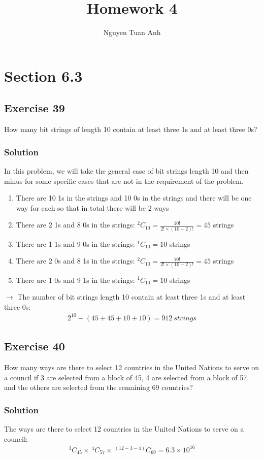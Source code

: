 \documentclass{article}
\title{Homework 4}
\author{Nguyen Tuan Anh}
\theoremstyle{mytheoremstyle}
\theoremstyle{mytheoremstyle}
\theoremstyle{myproblemstyle}
\begin{document}
    \maketitle
    \section*{Section 6.3}
    \subsection*{Exercise 39}
    How many bit strings of length 10 contain at least three
    1s and at least three 0s?
    \subsubsection*{Solution}
    In this problem, we will take the general case of bit strings length 10 and then minus
    for some specific cases that are not in the requirement of the problem.
    \begin{enumerate}
        \item There are 10 1s in the strings and 10 0s in the strings and there will be 
        one way for each so that in total there will be 2 ways
        \item There are 2 1s and 8 0s in the strings: $ ^2C_10 = \frac{10!}{2!\times(10 - 2)!} = 45 $ strings
        \item There are 1 1s and 9 0s in the strings: $ ^1C_10 = 10 $ strings
        \item There are 2 0s and 8 1s in the strings: $ ^2C_10 = \frac{10!}{2!\times(10 - 2)!} = 45 $ strings
        \item There are 1 0s and 9 1s in the strings: $ ^1C_10 = 10 $ strings
    \end{enumerate}
    $ \rightarrow $ The number of bit strings length 10 contain at least three 1s and at least three 0s:
    \begin{align*}
        2^{10} - (45 + 45 + 10 + 10) = 912 \ strings
    \end{align*}
    \subsection*{Exercise 40}
    How many ways are there to select 12 countries in the
    United Nations to serve on a council if 3 are selected from
    a block of 45, 4 are selected from a block of 57, and the
    others are selected from the remaining 69 countries?
    \subsubsection*{Solution}
    The ways are there to select 12 countries in the United Nations to serve on a council:
    \begin{align*}
        ^3C_{45} \times \ ^4C_{57} \times \ ^{(12 - 3 - 4)}C_{69} = 6.3 \times 10^{16} 
    \end{align*}
\end{document}
